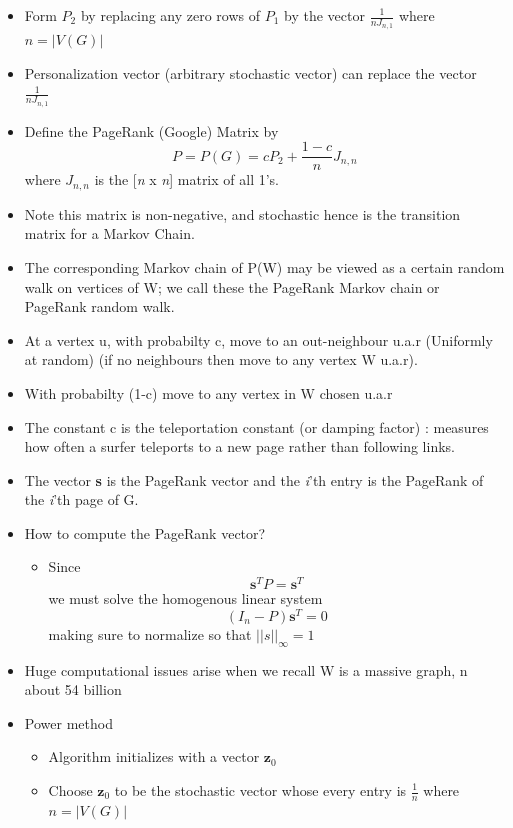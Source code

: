 \documentclass[11pt]{report}
\begin{document}
\begin{itemize}
\item Form $P_2$ by replacing any zero rows of $P_1$ by the vector \(\frac{1}{nJ_{n,1}}\) where \(n=|V(G)|\)
\item Personalization vector (arbitrary stochastic vector) can replace the vector \(\frac{1}{nJ_{n,1}}\)
\item Define the PageRank (Google) Matrix by \[P = P(G) = cP_2 +\frac{1-c}{n}J_{n,n} \] where $J_{n,n}$ is the [\textit{n} x \textit{n}] matrix of all 1's.
\item Note this matrix is non-negative, and stochastic hence is the transition matrix for a Markov Chain.
\item The corresponding Markov chain of P(W) may be viewed as a certain random walk on vertices of W; we call these the PageRank Markov chain or PageRank random walk.
\item At a vertex u, with probabilty c, move to an out-neighbour u.a.r (Uniformly at random) (if no neighbours then move to any vertex W u.a.r).
\item With probabilty (1-c) move to any vertex in W chosen u.a.r
\item The constant c is the teleportation constant (or damping factor) : measures how often a surfer teleports to a new page rather than following links.
\item The vector \textbf{s} is the PageRank vector and the \textit{i}'th entry is the PageRank of the \textit{i}'th page of G.
\item How to compute the PageRank vector?
\begin{itemize}
\item Since \begin{equation} \textbf{s}^T P = \textbf{s}^T\end{equation} we must solve the homogenous linear system \begin{equation}(I_n-P)\textbf{s}^T=0\end{equation} making sure to normalize so that \(||s||_\infty =1\)
\end{itemize}
\item Huge computational issues arise when we recall W is a massive graph, n about 54 billion
\item Power method
\begin{itemize}
\item Algorithm initializes with a vector $\textbf{z}_0$
\item Choose $\textbf{z}_0$ to be the stochastic vector whose every entry is $\frac{1}{n}$ where \(n=|V(G)|\)

\end{itemize}
\end{itemize}
\end{document}
